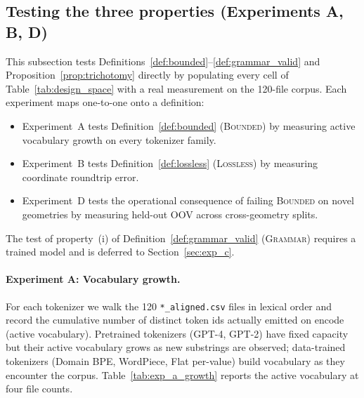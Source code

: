 \documentclass[sensors,article,submit,moreauthors,pdftex]{Definitions/mdpi}
\begin{document}
\subsection{Testing the three properties (Experiments A, B, D)}
\label{sec:design_space_exp}

This subsection tests Definitions~\ref{def:bounded}--\ref{def:grammar_valid} and Proposition~\ref{prop:trichotomy} directly by populating every cell of Table~\ref{tab:design_space} with a real measurement on the 120-file corpus. Each experiment maps one-to-one onto a definition:
\begin{itemize}[leftmargin=*, nosep]
    \item Experiment~A tests Definition~\ref{def:bounded} (\textsc{Bounded}) by measuring active vocabulary growth on every tokenizer family.
    \item Experiment~B tests Definition~\ref{def:lossless} (\textsc{Lossless}) by measuring coordinate roundtrip error.
    \item Experiment~D tests the operational consequence of failing \textsc{Bounded} on novel geometries by measuring held-out OOV across cross-geometry splits.
\end{itemize}
The test of property~(i) of Definition~\ref{def:grammar_valid} (\textsc{Grammar}) requires a trained model and is deferred to Section~\ref{sec:exp_c}.

\paragraph{Experiment A: Vocabulary growth.}
For each tokenizer we walk the 120 \texttt{*\_aligned.csv} files in lexical order and record the cumulative number of distinct token ids actually emitted on encode (active vocabulary). Pretrained tokenizers (GPT-4, GPT-2) have fixed capacity but their active vocabulary grows as new substrings are observed; data-trained tokenizers (Domain BPE, WordPiece, Flat per-value) build vocabulary as they encounter the corpus. Table~\ref{tab:exp_a_growth} reports the active vocabulary at four file counts.


\end{document}
